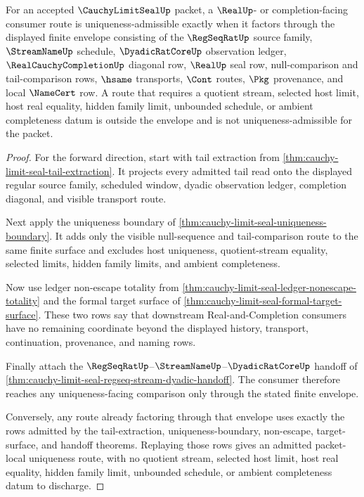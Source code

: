 \begin{theorem}
\label{thm:cauchy-limit-seal-finite-route-uniqueness-envelope}
For an accepted $\CauchyLimitSealUp$ packet, a $\RealUp$- or completion-facing consumer route is uniqueness-admissible exactly when it factors through the displayed finite envelope consisting of the $\RegSeqRatUp$ source family, $\StreamNameUp$ schedule, $\DyadicRatCoreUp$ observation ledger, $\RealCauchyCompletionUp$ diagonal row, $\RealUp$ seal row, null-comparison and tail-comparison rows, $\hsame$ transports, $\Cont$ routes, $\Pkg$ provenance, and local $\NameCert$ row. A route that requires a quotient stream, selected host limit, host real equality, hidden family limit, unbounded schedule, or ambient completeness datum is outside the envelope and is not uniqueness-admissible for the packet.
\end{theorem}
\begin{proof}
For the forward direction, start with tail extraction from \autoref{thm:cauchy-limit-seal-tail-extraction}. It projects every admitted tail read onto the displayed regular source family, scheduled window, dyadic observation ledger, completion diagonal, and visible transport route.

Next apply the uniqueness boundary of \autoref{thm:cauchy-limit-seal-uniqueness-boundary}. It adds only the visible null-sequence and tail-comparison route to the same finite surface and excludes host uniqueness, quotient-stream equality, selected limits, hidden family limits, and ambient completeness.

Now use ledger non-escape totality from \autoref{thm:cauchy-limit-seal-ledger-nonescape-totality} and the formal target surface of \autoref{thm:cauchy-limit-seal-formal-target-surface}. These two rows say that downstream Real-and-Completion consumers have no remaining coordinate beyond the displayed history, transport, continuation, provenance, and naming rows.

Finally attach the $\RegSeqRatUp$--$\StreamNameUp$--$\DyadicRatCoreUp$ handoff of \autoref{thm:cauchy-limit-seal-regseq-stream-dyadic-handoff}. The consumer therefore reaches any uniqueness-facing comparison only through the stated finite envelope.

Conversely, any route already factoring through that envelope uses exactly the rows admitted by the tail-extraction, uniqueness-boundary, non-escape, target-surface, and handoff theorems. Replaying those rows gives an admitted packet-local uniqueness route, with no quotient stream, selected host limit, host real equality, hidden family limit, unbounded schedule, or ambient completeness datum to discharge.
\end{proof}

